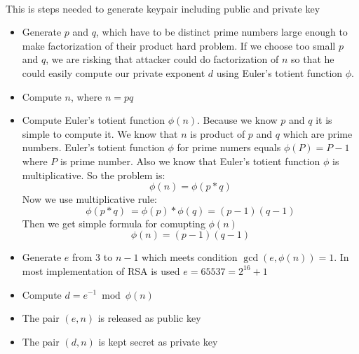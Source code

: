 \documentclass[thesis=B,english]{FITthesis}[2012/10/20]
\begin{document}
{{\paragraph*{}
{This is steps needed to generate keypair including public and private key}
\begin{itemize}
 \item Generate \(p\) and \(q\), which have to be distinct prime numbers large enough to make factorization of their product hard problem. If we choose too small \(p\) and \(q\), we are risking that attacker could do factorization of \(n\) so that he could easily compute our private exponent \(d\) using Euler's totient function \(\phi\).
 \item Compute \(n\), where \(n = p  q\)
 \item Compute Euler's totient function \(\phi(n)\). Because we know \(p\) and \(q\) it is simple to compute it. We know that  \(n\) is product of \(p\) and \(q\) which are prime numbers. Euler's totient function \(\phi\) for prime numers equals \(\phi(P) = P -1\) where \(P\) is prime number. Also we know that Euler's totient function \(\phi\) is multiplicative. So the problem is:
 \[\phi(n) = \phi(p*q)\]
 Now we use multiplicative rule:
 \[\phi(p*q)\ = \phi(p)* \phi(q) = (p - 1)(q - 1)\]
 Then we get simple formula for comupting \(\phi(n)\)
 \[\phi(n) = (p - 1)(q - 1)\]
 \item Generate \(e\) from 3 to  \(n - 1\) which meets condition \(\gcd(e,\phi(n)) = 1\). In most implementation of RSA is used \(e = 65537 = 2^{16} + 1\)
 \item Compute \(d = e^{-1}\bmod{\phi(n)} \)
 \item The pair \((e,n)\) is released as public key
 \item The pair \((d,n)\) is kept secret as private key
\end{itemize}

}}
\end{document}
